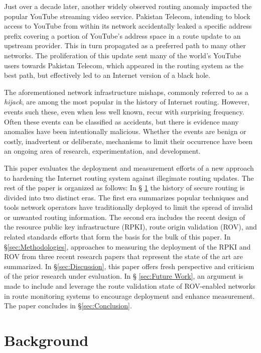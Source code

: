 \documentclass[sigconf]{acmart}
\begin{document}
Just over a decade later, another widely observed routing anomaly
impacted the popular YouTube streaming video
service.\cite{brown_pakistan_2008}  Pakistan Telecom, intending to block
access to YouTube from within its network accidentally leaked a specific
address prefix covering a portion of YouTube's address space in a route
update to an upstream provider.  This in turn propagated as a preferred
path to many other networks.  The proliferation of this update sent many
of the world's YouTube users towards Pakistan Telecom, which appeared in
the routing system as the best path, but effectively led to an Internet
version of a black hole.

The aforementioned network infrastructure mishaps, commonly referred to
as a \emph{hijack}, are among the most popular in the history of
Internet routing.  However, events such these, even when less well
known, recur with surprising frequency.  Often these events can be
classified as accidents, but there is evidence many anomalies have been
intentionally malicious.\cite{madory_bgp_2018}  Whether the events are
benign or costly, inadvertent or deliberate, mechanisms to limit their
occurrence have been an ongoing area of research, experimentation, and
development.

This paper evaluates the deployment and measurement efforts of a new
approach to hardening the Internet routing system against illegimate
routing updates.  The rest of the paper is organized as follows: In \S
\ref{sec:Background} the history of secure routing is divided into two
distinct eras.  The first era summarizes popular techniques and tools
network operators have traditionally deployed to limit the spread of
invalid or unwanted routing information.  The second era includes the
recent design of the resource public key infrastructure (RPKI), route
origin validation (ROV), and related standards efforts that form the
basis for the bulk of this paper.  In \S \ref{sec:Methodologies},
approaches to measuring the deployment of the RPKI and ROV from three
recent research papers that represent the state of the art are
summarized.  In \S \ref{sec:Discussion}, this paper offers fresh
perspective and criticism of the prior research under evaluation.  In \S
\ref{sec:Future Work}, an argument is made to include and leverage the
route validation state of ROV-enabled networks in route monitoring
systems to encourage deployment and enhance measurement.  The paper
concludes in \S \ref{sec:Conclusion}.

\section{Background}\label{sec:Background}
\end{document}

